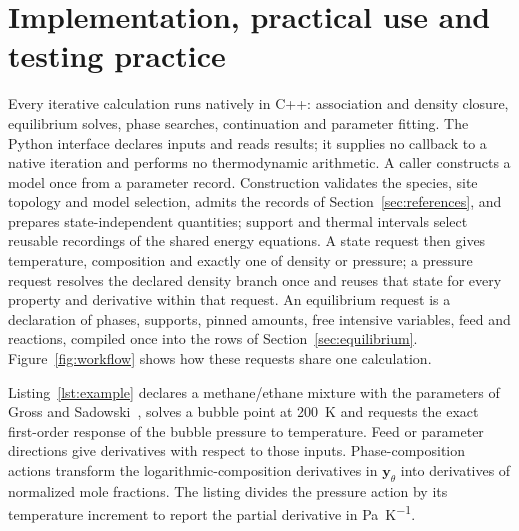 \section{Implementation, practical use and testing practice}
\label{sec:implementation}
Every iterative calculation runs natively in C++: association and density closure, equilibrium solves, phase searches, continuation and parameter fitting.
The Python interface declares inputs and reads results; it supplies no callback to a native iteration and performs no thermodynamic arithmetic.
A caller constructs a model once from a parameter record.
Construction validates the species, site topology and model selection, admits the records of Section~\ref{sec:references}, and prepares state-independent quantities; support and thermal intervals select reusable recordings of the shared energy equations.
A state request then gives temperature, composition and exactly one of density or pressure; a pressure request resolves the declared density branch once and reuses that state for every property and derivative within that request.
An equilibrium request is a declaration of phases, supports, pinned amounts, free intensive variables, feed and reactions, compiled once into the rows of Section~\ref{sec:equilibrium}.
Figure~\ref{fig:workflow} shows how these requests share one calculation.

Listing~\ref{lst:example} declares a methane/ethane mixture with the parameters of Gross and Sadowski~\citep{Gross2001}, solves a bubble point at 200~K and requests the exact first-order response of the bubble pressure to temperature.
Feed or parameter directions give derivatives with respect to those inputs.
Phase-composition actions transform the logarithmic-composition derivatives in $\mathbf{y}_\theta$ into derivatives of normalized mole fractions.
The listing divides the pressure action by its temperature increment to report the partial derivative in \si{\pascal\per\kelvin}.

